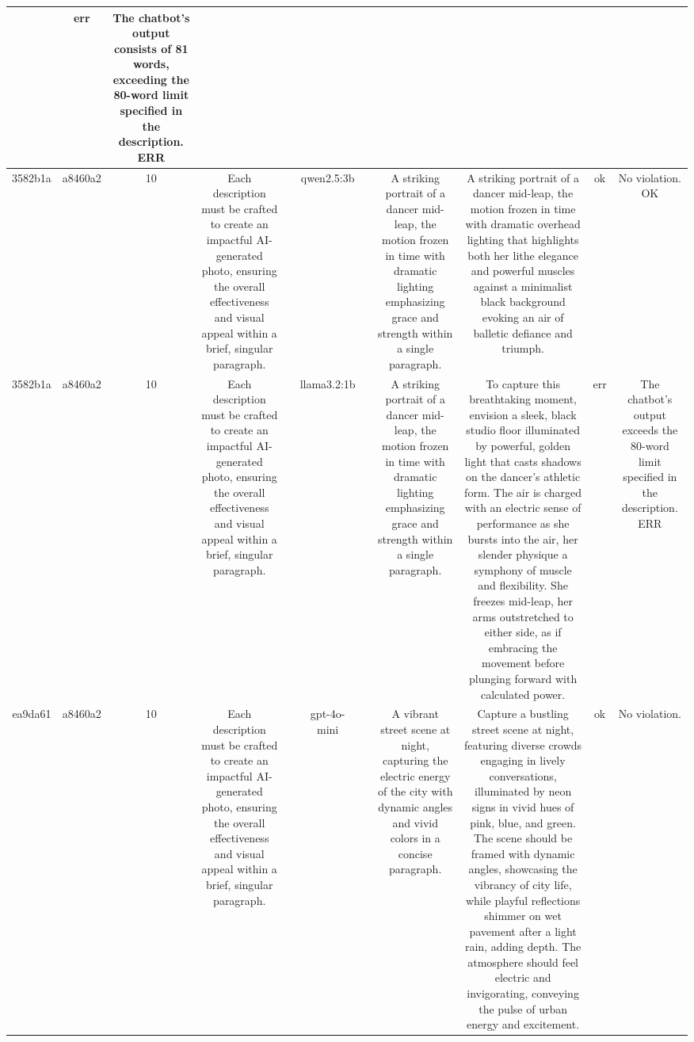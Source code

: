 \begin{table}[h!]
\begin{tabular}{|c|c|c|c|c|c|c|c|c|c|c|}
 & err & The chatbot's output consists of 81 words, exceeding the 80-word limit specified in the description.
ERR\\
\hline
3582b1a & a8460a2 & 10 & Each description must be crafted to create an impactful AI-generated photo, ensuring the overall effectiveness and visual appeal within a brief, singular paragraph. &  & qwen2.5:3b &  & A striking portrait of a dancer mid-leap, the motion frozen in time with dramatic lighting emphasizing grace and strength within a single paragraph. & A striking portrait of a dancer mid-leap, the motion frozen in time with dramatic overhead lighting that highlights both her lithe elegance and powerful muscles against a minimalist black background evoking an air of balletic defiance and triumph. & ok & No violation.
OK\\
\hline
3582b1a & a8460a2 & 10 & Each description must be crafted to create an impactful AI-generated photo, ensuring the overall effectiveness and visual appeal within a brief, singular paragraph. &  & llama3.2:1b &  & A striking portrait of a dancer mid-leap, the motion frozen in time with dramatic lighting emphasizing grace and strength within a single paragraph. & To capture this breathtaking moment, envision a sleek, black studio floor illuminated by powerful, golden light that casts shadows on the dancer's athletic form. The air is charged with an electric sense of performance as she bursts into the air, her slender physique a symphony of muscle and flexibility. She freezes mid-leap, her arms outstretched to either side, as if embracing the movement before plunging forward with calculated power. & err & The chatbot's output exceeds the 80-word limit specified in the description.
ERR\\
\hline
ea9da61 & a8460a2 & 10 & Each description must be crafted to create an impactful AI-generated photo, ensuring the overall effectiveness and visual appeal within a brief, singular paragraph. &  & gpt-4o-mini &  & A vibrant street scene at night, capturing the electric energy of the city with dynamic angles and vivid colors in a concise paragraph. & Capture a bustling street scene at night, featuring diverse crowds engaging in lively conversations, illuminated by neon signs in vivid hues of pink, blue, and green. The scene should be framed with dynamic angles, showcasing the vibrancy of city life, while playful reflections shimmer on wet pavement after a light rain, adding depth. The atmosphere should feel electric and invigorating, conveying the pulse of urban energy and excitement. & ok & No violation.

\end{tabular}
\end{table}
